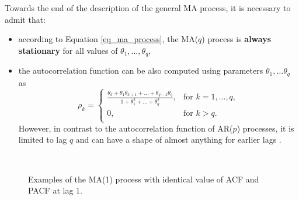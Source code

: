 Towards the end of the description of the general MA process, it is necessary to admit that:
\begin{itemize}
    \item{according to Equation \ref{eq_ma_process}, the MA($q$) process is \textbf{always stationary} for all values of $\theta_1, \ldots, \theta_q$,}
    \item{the autocorrelation function can be also computed using parameters $\theta_1, \ldots \theta_q$ as \begin{equation}
        \rho_k=   \left\{
    \begin{array}{ll}
      \frac{\theta_k + \theta_{1}\theta_{k+1} + \ldots + \theta_{q-k}\theta_{q}}{1 + \theta_{1}^{2} + \ldots + \theta_{q}^{2}}, & \text{for } k = 1, \ldots, q,\\
      0, & \text{for } k > q. \\
    \end{array} 
    \right.
    \end{equation}
    However, in contrast to the autocorrelation function of AR($p$) processes, it is limited to lag $q$ and can have a shape of almost anything for earlier lags \cite{cryer2008time}.}
\end{itemize}

\begin{figure}[!ht]
  \centering
   \\
  \caption{Examples of the MA(1) process with identical value of ACF and PACF at lag 1.}
  \label{fig:ma_1_example}
\end{figure}

